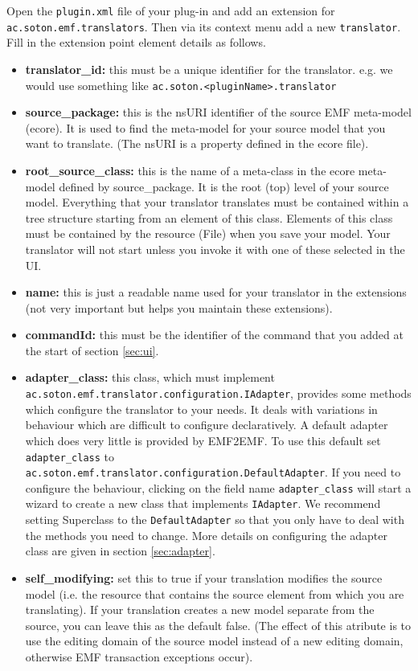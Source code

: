 	Open the \texttt{plugin.xml} file of your plug-in and add an extension for \texttt{ac.soton.emf.translators}. Then via its context menu add a new \texttt{translator}. Fill in the extension point element details as follows.
	\begin{itemize}
		\item \textbf{translator\_id:} this must be a unique identifier for the translator. e.g. we would use something like \texttt{ac.soton.<pluginName>.translator}
		\item \textbf{source\_package:} this is the nsURI identifier of the source EMF meta-model (ecore). It is used to find the meta-model for your source model that you want to translate. (The nsURI is a property defined in the ecore file).
		\item \textbf{root\_source\_class:} this is the name of a meta-class in the ecore meta-model defined by source\_package. It is the root (top) level of your source model. Everything that your translator translates must be contained within a tree structure starting from an element of this class. Elements of this class must be contained by the resource (File) when you save your model. Your translator will not start unless you invoke it with one of these selected in the UI.
		\item \textbf{name:} this is just a readable name used for your translator in the extensions (not very important but helps you maintain these extensions).
		\item \textbf{commandId:} this must be the identifier of the command that you added at the start of section \ref{sec:ui}.
		\item \textbf{adapter\_class:} this class, which must implement\\ \texttt{ac.soton.emf.translator.configuration.IAdapter}, provides some methods which configure the translator to your needs. It deals with variations in behaviour which are difficult to configure declaratively. A default adapter which does very little is provided by EMF2EMF. To use this default set \texttt{adapter\_class} to\\ \texttt{ac.soton.emf.translator.configuration.DefaultAdapter}. If you need to configure the behaviour, clicking on the field name \texttt{adapter\_class} will start a wizard to create a new class that implements \texttt{IAdapter}. We recommend setting Superclass to the \texttt{DefaultAdapter} so that you only have to deal with the methods you need to change. More details on configuring the adapter class are given in section \ref{sec:adapter}. 
		\item \textbf{self\_modifying:} set this to true if your translation modifies the source model (i.e. the resource that contains the source element from which you are translating). If your translation creates a new model separate from the source, you can leave this as the default false. (The effect of this atribute is to use the editing domain of the source model instead of a new editing domain, otherwise EMF transaction exceptions occur).
	\end{itemize}

